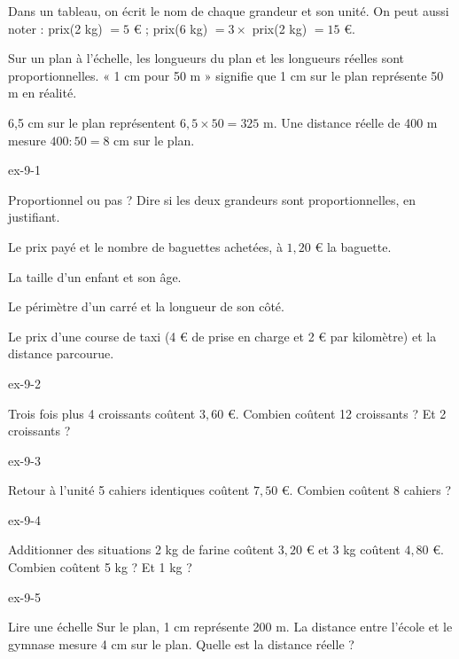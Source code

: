 \begin{exemple}Dans un tableau, on écrit le nom de chaque grandeur et son unité. On peut aussi noter : prix(2 kg) $=5$ € ; prix(6 kg) $=3\times$ prix(2 kg) $=15$ €.\end{exemple}
\begin{definition}Sur un plan à l’échelle, les longueurs du plan et les longueurs réelles sont proportionnelles. « 1 cm pour 50 m » signifie que 1 cm sur le plan représente 50 m en réalité.\end{definition}
\label{fig-cours-9-2-cours-echelle}

\begin{savoirfaire}6,5 cm sur le plan représentent $6{,}5\times50=325$ m. Une distance réelle de 400 m mesure $400:50=8$ cm sur le plan.\end{savoirfaire}

\clearpage{}
\begin{blocLivre}{ex-9-1}\begin{exercice}[1]{Proportionnel ou pas ?}
Dire si les deux grandeurs sont proportionnelles, en justifiant.\begin{questions}
\item Le prix payé et le nombre de baguettes achetées, à $1{,}20$ € la baguette.
\item La taille d’un enfant et son âge.
\item Le périmètre d’un carré et la longueur de son côté.
\item Le prix d’une course de taxi (4 € de prise en charge et 2 € par kilomètre) et la distance parcourue.
\end{questions}
\end{exercice}\end{blocLivre}
\begin{blocLivre}{ex-9-2}\begin{exercice}[1]{Trois fois plus}
4 croissants coûtent $3{,}60$ €. Combien coûtent 12 croissants ? Et 2 croissants ?
\end{exercice}\end{blocLivre}
\begin{blocLivre}{ex-9-3}\begin{exercice}[1]{Retour à l’unité}
5 cahiers identiques coûtent $7{,}50$ €. Combien coûtent 8 cahiers ?
\end{exercice}\end{blocLivre}
\begin{blocLivre}{ex-9-4}\begin{exercice}[1]{Additionner des situations}
2 kg de farine coûtent $3{,}20$ € et 3 kg coûtent $4{,}80$ €. Combien coûtent 5 kg ? Et 1 kg ?
\end{exercice}\end{blocLivre}
\begin{blocLivre}{ex-9-5}\begin{exercice}[1]{Lire une échelle}
Sur le plan, 1 cm représente 200 m. La distance entre l’école et le gymnase mesure 4 cm sur le plan. Quelle est la distance réelle ?
\label{fig-ex-9-5}
\end{exercice}\end{blocLivre}

